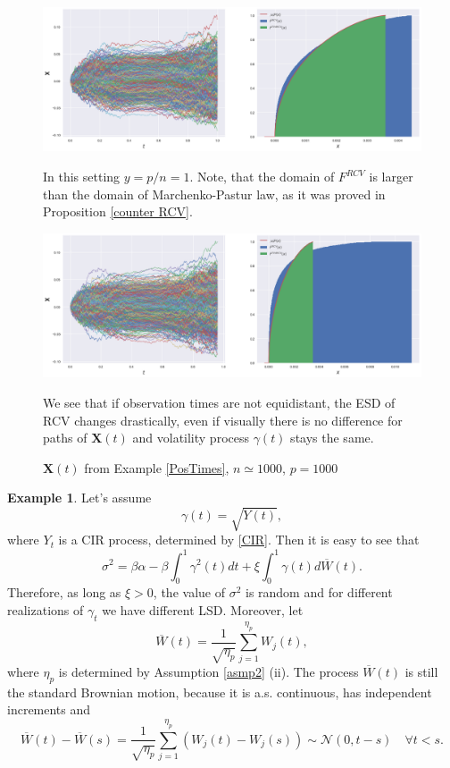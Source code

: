 \documentclass[a4paper,11pt]{book}
\theoremstyle{plain}
\theoremstyle{definition}
\newtheorem{exmp}[thm]{Example}
\begin{document}
    \begin{figure}
    	\begin{center} \centering
    		\includegraphics[scale=0.4]{XCos}
    		\caption{ $\mathbf{X}(t)$ from Example \ref{SimCos}, $n = 1000$, $p=1000$ }
    		\smallskip
    		\small
    		In this setting $y = p/n = 1$. Note, that the domain of $F^{RCV}$ is larger than the domain of Marchenko-Pastur law, as it was proved in Proposition \ref{counter RCV}.
    	\end{center}
    	\begin{center} \centering
    		\includegraphics[scale=0.4]{Xcostimes}
    		\caption{ $\mathbf{X}(t)$ from Example \ref{PosTimes}, $n \simeq 1000$, $p=1000$ }
    		\smallskip
    		\small
    		We see that if observation times are not equidistant, the ESD of RCV changes drastically, even if visually there is no difference for paths of $\mathbf{X}(t)$ and volatility process $\gamma(t)$ stays the same.
    	\end{center}
    \end{figure}
    
    \begin{exmp} \label{SimCIR}
    	Let's assume
    	\[ \gamma(t) = \sqrt{Y(t)}, \]
    	where $Y_t$ is a CIR process, determined by \eqref{CIR}. Then it is easy to see that
    	\[ \sigma^2 = \beta\alpha - \beta\int_{0}^{1} \gamma^2(t)dt + \xi \int_{0}^{1} \gamma(t) d\overline{W}(t).\]
    	Therefore, as long as $\xi > 0$, the value of $\sigma^2$ is random and for different realizations of $\gamma_t$ we have different LSD.
    	Moreover, let
    	\[ \overline{W}(t) = \frac{1}{\sqrt{\eta_p}} \sum_{j=1}^{\eta_p}W_j(t), \]
    	where $\eta_p$ is determined by Assumption \ref{asmp2} (ii). The process $\overline{W}(t)$ is still the standard Brownian motion, because it is a.s. continuous, has independent increments and
    	\[ \overline{W}(t) - \overline{W}(s) = \frac{1}{\sqrt{\eta_p}} \sum_{j=1}^{\eta_p}(W_j(t)-W_j(s)) \sim \mathcal{N}(0, t-s) \quad \forall t < s. \]
    \end{exmp}
    
\end{document}
